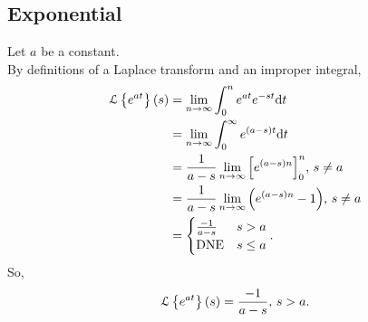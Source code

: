 \subsection{Exponential}
\noindent
Let $a$ be a constant.\\
By definitions of a Laplace transform and an improper integral,
\begin{align*}
	\mathcal{L}\left\{ e^{at} \right\}\left(s\right) &= \lim\limits_{n\to\infty}{\int_{0}^{n}{e^{at}e^{-st}\mathrm{d}t}} \\
	 &= \lim\limits_{n\to\infty}{\int_{0}^{\infty}{e^{(a-s)t} \mathrm{d}t}} \\
	 &= \frac{1}{a-s}\lim\limits_{n\to\infty}{\left[e^{(a-s)n}\right]}_{0}^{n} \text{, } s \neq a \\
	 &= \frac{1}{a-s}\lim\limits_{n\to\infty}{\left(e^{(a-s)n} - 1\right)} \text{, } s \neq a \\
	 &= \begin{cases}
	 	\frac{-1}{a-s} & s > a \\
	 	\text{DNE} & s \leq a
	 \end{cases}.
\end{align*}
So,
\begin{equation*}
	\mathcal{L}\left\{ e^{at} \right\}\left(s\right) = \frac{-1}{a-s} \text{, } s > a.
\end{equation*}